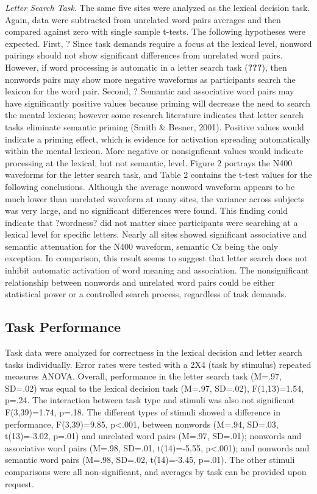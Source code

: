 \documentclass[english,man]{apa6}
\theoremstyle{definition}
\theoremstyle{definition}
\theoremstyle{definition}
\theoremstyle{remark}
\begin{document}
\emph{Letter Search Task}. The same five sites were analyzed as the
lexical decision task. Again, data were subtracted from unrelated word
pairs averages and then compared against zero with single sample
t-tests. The following hypotheses were expected. First, ? Since task
demands require a focus at the lexical level, nonword pairings should
not show significant differences from unrelated word pairs. However, if
word processing is automatic in a letter search task ({\textbf{???}}),
then nonwords pairs may show more negative waveforms as participants
search the lexicon for the word pair. Second, ? Semantic and associative
word pairs may have significantly positive values because priming will
decrease the need to search the mental lexicon; however some research
literature indicates that letter search tasks eliminate semantic priming
(Smith \& Besner, 2001). Positive values would indicate a priming
effect, which is evidence for activation spreading automatically within
the mental lexicon. More negative or nonsignficant values would indicate
processing at the lexical, but not semantic, level. Figure 2 portrays
the N400 waveforms for the letter search task, and Table 2 contains the
t-test values for the following conclusions. Although the average
nonword waveform appears to be much lower than unrelated waveform at
many sites, the variance across subjects was very large, and no
significant differences were found. This finding could indicate that
?wordness? did not matter since participants were searching at a lexical
level for specific letters. Nearly all sites showed significant
associative and semantic attenuation for the N400 waveform, semantic Cz
being the only exception. In comparison, this result seems to suggest
that letter search does not inhibit automatic activation of word meaning
and association. The nonsignificant relationship between nonwords and
unrelated word pairs could be either statistical power or a controlled
search process, regardless of task demands.

\subsection{Task Performance}\label{task-performance}

Task data were analyzed for correctness in the lexical decision and
letter search tasks individually. Error rates were tested with a 2X4
(task by stimulus) repeated measures ANOVA. Overall, performance in the
letter search task (M=.97, SD=.02) was equal to the lexical decision
task (M=.97, SD=.02), F(1,13)=1.54, p=.24. The interaction between task
type and stimuli was also not significant F(3,39)=1.74, p=.18. The
different types of stimuli showed a difference in performance,
F(3,39)=9.85, p\textless{}.001, between nonwords (M=.94, SD=.03,
t(13)=-3.02, p=.01) and unrelated word pairs (M=.97, SD=.01); nonwords
and associative word pairs (M=.98, SD=.01, t(14)=-5.55,
p\textless{}.001); and nonwords and semantic word pairs (M=.98, SD=.02,
t(14)=-3.45, p=.01). The other stimuli comparisons were all
non-significant, and averages by task can be provided upon request.
\end{document}
